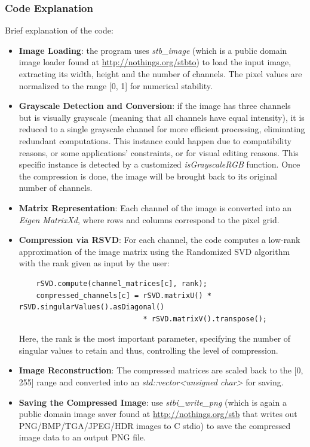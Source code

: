 \documentclass[11pt,a4paper]{article}
\begin{document}
\subsubsection{Code Explanation}
Brief explanation of the code: 
\begin{itemize}
    \item \textbf{Image Loading}: the program uses \textit{stb\_image} (which is a public domain image loader found at \url{http://nothings.org/stbto}) to load the input image, extracting its width, height and the number of channels. The pixel values are normalized to the range [0, 1] for numerical stability.
    \item \textbf{Grayscale Detection and Conversion}: if the image has three channels but is visually grayscale (meaning that all channels have equal intensity), it is reduced to a single grayscale channel for more efficient processing, eliminating redundant computations. This instance could happen due to compatibility reasons, or some applications' constraints, or for visual editing reasons. This specific instance is detected by a customized \textit{isGrayscaleRGB} function. Once the compression is done, the image will be brought back to its original number of channels.
    \item \textbf{Matrix Representation}: Each channel of the image is converted into an \textit{Eigen MatrixXd}, where rows and columns correspond to the pixel grid.
    \item \textbf{Compression via RSVD}: For each channel, the code computes a low-rank approximation of the image matrix using the Randomized SVD algorithm with the rank given as input by the user: \\
    \begin{verbatim}
    rSVD.compute(channel_matrices[c], rank);
    compressed_channels[c] = rSVD.matrixU() * rSVD.singularValues().asDiagonal()
                             * rSVD.matrixV().transpose();
    \end{verbatim}
    Here, the rank is the most important parameter, specifying the number of singular values to retain and thus, controlling the level of compression.
    \item \textbf{Image Reconstruction}: The compressed matrices are scaled back to the [0, 255] range and converted into an \textit{std::vector<unsigned char>} for saving.
    \item \textbf{Saving the Compressed Image}: use \textit{stbi\_write\_png} (which is again a public domain image saver found at \url{http://nothings.org/stb} that writes out PNG/BMP/TGA/JPEG/HDR images to C stdio) to save the compressed image data to an output PNG file.

\end{itemize}
\end{document}

